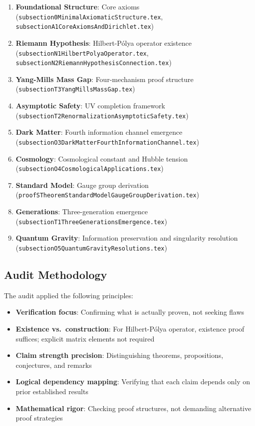 \documentclass[11pt,a4paper]{article}
\theoremstyle{definition}
\begin{document}
\begin{enumerate}
    \item \textbf{Foundational Structure}: Core axioms (\texttt{subsection0MinimalAxiomaticStructure.tex}, \texttt{subsectionA1CoreAxiomsAndDirichlet.tex})
    \item \textbf{Riemann Hypothesis}: Hilbert-Pólya operator existence (\texttt{subsectionN1HilbertPolyaOperator.tex}, \texttt{subsectionN2RiemannHypothesisConnection.tex})
    \item \textbf{Yang-Mills Mass Gap}: Four-mechanism proof structure (\texttt{subsectionT3YangMillsMassGap.tex})
    \item \textbf{Asymptotic Safety}: UV completion framework (\texttt{subsectionT2RenormalizationAsymptoticSafety.tex})
    \item \textbf{Dark Matter}: Fourth information channel emergence (\texttt{subsectionO3DarkMatterFourthInformationChannel.tex})
    \item \textbf{Cosmology}: Cosmological constant and Hubble tension (\texttt{subsectionO4CosmologicalApplications.tex})
    \item \textbf{Standard Model}: Gauge group derivation (\texttt{proofSTheoremStandardModelGaugeGroupDerivation.tex})
    \item \textbf{Generations}: Three-generation emergence (\texttt{subsectionT1ThreeGenerationsEmergence.tex})
    \item \textbf{Quantum Gravity}: Information preservation and singularity resolution (\texttt{subsectionO5QuantumGravityResolutions.tex})
\end{enumerate}

\subsection{Audit Methodology}

The audit applied the following principles:

\begin{itemize}
    \item \textbf{Verification focus}: Confirming what is actually proven, not seeking flaws
    \item \textbf{Existence vs.\ construction}: For Hilbert-Pólya operator, existence proof suffices; explicit matrix elements not required
    \item \textbf{Claim strength precision}: Distinguishing theorems, propositions, conjectures, and remarks
    \item \textbf{Logical dependency mapping}: Verifying that each claim depends only on prior established results
    \item \textbf{Mathematical rigor}: Checking proof structures, not demanding alternative proof strategies
\end{itemize}
\end{document}
